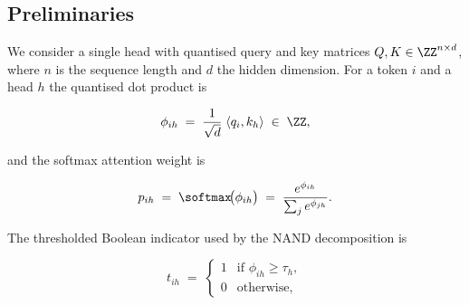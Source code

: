 \subsection{Preliminaries}













We consider a single head with quantised query and key matrices $Q,K\in\ZZ^{n\times d}$, where $n$ is the sequence length and $d$ the hidden dimension.  For a token $i$ and a head $h$ the quantised dot product is






\[






\phi_{ih} \;=\; \frac{1}{\sqrt{d}}\;\langle q_{i},k_{h}\rangle






  \;\in\;\ZZ,






\]






and the softmax attention weight is






\[






p_{ih} \;=\;{\softmax}\!\bigl(\phi_{ih}\bigr)






  \;=\;\frac{e^{\phi_{ih}}}{\sum_{j}e^{\phi_{jh}}}.






\]






The thresholded Boolean indicator used by the NAND decomposition is






\[






t_{ih}\;=\;\begin{cases}






1 & \text{if }\phi_{ih}\ge \tau_h,\\






0 & \text{otherwise},






\end{cases}






\]






